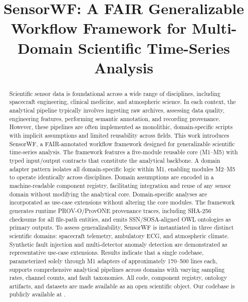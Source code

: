 \documentclass[conference]{IEEEtran}
\begin{document}
\title{SensorWF: A FAIR Generalizable Workflow Framework for Multi-Domain Scientific Time-Series Analysis}

\author{

}

\maketitle

\begin{abstract}
Scientific sensor data is foundational across a wide range of disciplines, including spacecraft engineering, clinical medicine, and atmospheric science. In each context, the analytical pipeline typically involves ingesting raw archives, assessing data quality, engineering features, performing semantic annotation, and recording provenance. However, these pipelines are often implemented as monolithic, domain-specific scripts with implicit assumptions and limited reusability across fields. This work introduces SensorWF, a FAIR-annotated workflow framework designed for generalizable scientific time-series analysis. The framework features a five-module reusable core (M1–M5) with typed input/output contracts that constitute the analytical backbone. A domain adapter pattern isolates all domain-specific logic within M1, enabling modules M2–M5 to operate identically across disciplines. Domain assumptions are encoded in a machine-readable component registry, facilitating integration and reuse of any sensor domain without modifying the analytical core. Domain-specific analyses are incorporated as use-case extensions without altering the core modules. The framework generates runtime PROV-O/ProvONE provenance traces, including SHA-256 checksums for all file-path entities, and emits SSN/SOSA-aligned OWL ontologies as primary outputs. To assess generalizability, SensorWF is instantiated in three distinct scientific domains: spacecraft telemetry, ambulatory ECG, and atmospheric climate. Synthetic fault injection and multi-detector anomaly detection are demonstrated as representative use-case extensions. Results indicate that a single codebase, parameterized solely through M1 adapters of approximately 170–500 lines each, supports comprehensive analytical pipelines across domains with varying sampling rates, channel counts, and fault taxonomies. All code, component registry, ontology artifacts, and datasets are made available as an open scientific object. Our codebase is publicly available at \href{}{}.
\end{abstract}
\end{document}
